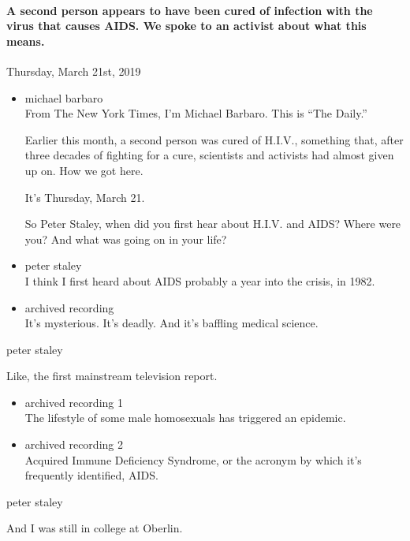 \hypertarget{a-second-person-appears-to-have-been-cured-of-infection-with-the-virus-that-causes-aids-we-spoke-to-an-activist-about-what-this-means}{%
\paragraph{A second person appears to have been cured of infection with
the virus that causes AIDS. We spoke to an activist about what this
means.}\label{a-second-person-appears-to-have-been-cured-of-infection-with-the-virus-that-causes-aids-we-spoke-to-an-activist-about-what-this-means}}

Thursday, March 21st, 2019

\begin{itemize}
\item
  michael barbaro\\
  From The New York Times, I'm Michael Barbaro. This is ``The Daily.''

  Earlier this month, a second person was cured of H.I.V., something
  that, after three decades of fighting for a cure, scientists and
  activists had almost given up on. How we got here.

  It's Thursday, March 21.

  So Peter Staley, when did you first hear about H.I.V. and AIDS? Where
  were you? And what was going on in your life?
\item
  peter staley\\
  I think I first heard about AIDS probably a year into the crisis, in
  1982.
\item
  archived recording\\
  It's mysterious. It's deadly. And it's baffling medical science.
\end{itemize}

peter staley

Like, the first mainstream television report.

\begin{itemize}
\item
  archived recording 1\\
  The lifestyle of some male homosexuals has triggered an epidemic.
\item
  archived recording 2\\
  Acquired Immune Deficiency Syndrome, or the acronym by which it's
  frequently identified, AIDS.
\end{itemize}

peter staley

And I was still in college at Oberlin.

